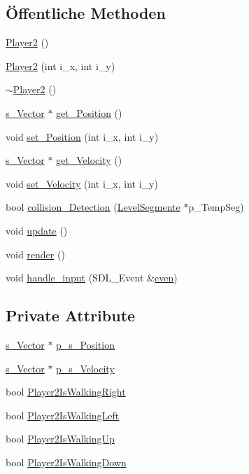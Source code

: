 \subsection*{Öffentliche Methoden}
\begin{DoxyCompactItemize}
\item 
\hyperlink{class_player2_acb393ded989958cc2771e4363ff3c107}{Player2} ()
\item 
\hyperlink{class_player2_ac21206d9a2860c10a510a8200e5b1d82}{Player2} (int i\-\_\-x, int i\-\_\-y)
\item 
\hyperlink{class_player2_a80c6d67d67827f3f2ac05214dadddfd3}{$\sim$\-Player2} ()
\item 
\hyperlink{structs___vector}{s\-\_\-\-Vector} $\ast$ \hyperlink{class_player2_a78d7625285d5fab78431e257325f5592}{get\-\_\-\-Position} ()
\item 
void \hyperlink{class_player2_a3a6f363502f4241020de0e641dad4111}{set\-\_\-\-Position} (int i\-\_\-x, int i\-\_\-y)
\item 
\hyperlink{structs___vector}{s\-\_\-\-Vector} $\ast$ \hyperlink{class_player2_a05675802549c3f3458fa38129ee77cfd}{get\-\_\-\-Velocity} ()
\item 
void \hyperlink{class_player2_a0a386cf73970cab8fb22462fbc252fa3}{set\-\_\-\-Velocity} (int i\-\_\-x, int i\-\_\-y)
\item 
bool \hyperlink{class_player2_a8433489a1c934924f93b3164194e6bbb}{collision\-\_\-\-Detection} (\hyperlink{class_level_segmente}{Level\-Segmente} $\ast$p\-\_\-\-Temp\-Seg)
\item 
void \hyperlink{class_player2_a930161d0d6bad9b47852ff1127da3ff5}{update} ()
\item 
void \hyperlink{class_player2_a4a4b0e14f00b815f6b190939d83be5fa}{render} ()
\item 
void \hyperlink{class_player2_abbe0b72e64e8d72b88dd2f2f87b61e94}{handle\-\_\-input} (S\-D\-L\-\_\-\-Event \&\hyperlink{main_8cpp_af6a41c81a6372a814ffae9ba6615e1e7}{even})
\end{DoxyCompactItemize}
\subsection*{Private Attribute}
\begin{DoxyCompactItemize}
\item 
\hyperlink{structs___vector}{s\-\_\-\-Vector} $\ast$ \hyperlink{class_player2_a4860deaf1ac80d595c1a43a6453514b2}{p\-\_\-s\-\_\-\-Position}
\item 
\hyperlink{structs___vector}{s\-\_\-\-Vector} $\ast$ \hyperlink{class_player2_a4ec7a7c22808ad8f266ec881151bbe8e}{p\-\_\-s\-\_\-\-Velocity}
\item 
bool \hyperlink{class_player2_a27e2e4fa537e02e01bff0a5867540fa6}{Player2\-Is\-Walking\-Right}
\item 
bool \hyperlink{class_player2_aee050a236d79f3f1323ee728716d3a5f}{Player2\-Is\-Walking\-Left}
\item 
bool \hyperlink{class_player2_a10ac2da1c761c4942333980d8bdcff4e}{Player2\-Is\-Walking\-Up}
\item 
bool \hyperlink{class_player2_acaa30e9bf46123ac88a0e2dcde20db03}{Player2\-Is\-Walking\-Down}
\end{DoxyCompactItemize}


